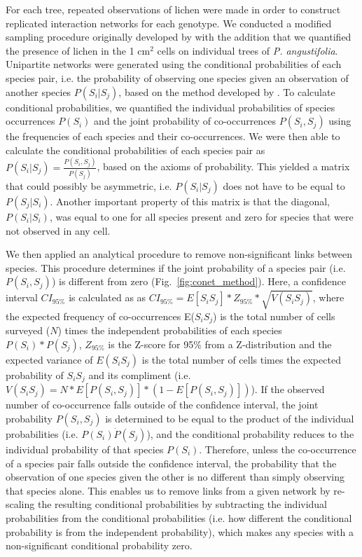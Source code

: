 \documentclass[11pt,twocolumn,twoside,lineno]{pnas-new}
\begin{document}
{For each tree, repeated observations of lichen were made in order to
construct replicated interaction networks for each genotype. We
conducted a modified sampling procedure originally developed by
\citep{Lamit2015a} with the addition that we quantified the presence
of lichen in the 1 cm$^2$ cells on individual trees of
\textit{P. angustifolia}. Unipartite networks were generated using the
conditional probabilities of each species pair, i.e. the probability
of observing one species given an observation of another species
$P(S_i | S_j)$, based on the method developed by
\citep{Araujo2011}. To calculate conditional probabilities, we
quantified the individual probabilities of species occurrences
$P(S_i)$ and the joint probability of co-occurrences $P(S_i, S_j)$
using the frequencies of each species and their co-occurrences. We
were then able to calculate the conditional probabilities of each
species pair as $P(S_i|S_j) = \frac{P(S_i,S_j)}{P(S_j)}$, based on the
axioms of probability. This yielded a matrix that could possibly be
asymmetric, i.e. $P(S_i|S_j)$ does not have to be equal to
$P(S_j|S_i)$. Another important property of this matrix is that the
diagonal, $P(S_{i} | S_{i})$, was equal to one for all species present
and zero for species that were not observed in any cell.

We then applied an analytical procedure to remove non-significant
links between species. This procedure determines if the joint
probability of a species pair (i.e. $P(S_i,S_j)$) is different from
zero (Fig.~\ref{fig:conet_method}).  Here, a confidence interval
$CI_{95\%}$ is calculated as as $CI_{95\%} = E[S_iS_j] * Z_{95\%} *
\sqrt{V(S_iS_j)}$, where the expected frequency of co-occurrences
E($S_iS_j$) is the total number of cells surveyed ($N$) times the
independent probabilities of each species $P(S_i) * P(S_j)$,
$Z_{95\%}$ is the Z-score for 95\% from a Z-distribution and the
expected variance of $E(S_iS_j)$ is the total number of cells times
the expected probability of $S_iS_j$ and its compliment
(i.e. $V(S_iS_j) = N * E[P(S_i,S_j)] * (1 - E[P(S_i,S_j)])$). If the
observed number of co-occurrence falls outside of the confidence
interval, the joint probability $P(S_i,S_j)$ is determined to be equal
to the product of the individual probabilities (i.e. $P(S_i) \dot
P(S_j)$), and the conditional probability reduces to the individual
probability of that species $P(S_i)$. Therefore, unless the
co-occurrence of a species pair falls outside the confidence interval,
the probability that the observation of one species given the other is
no different than simply observing that species alone. This enables us
to remove links from a given network by re-scaling the resulting
conditional probabilities by subtracting the individual probabilities
from the conditional probabilities (i.e. how different the conditional
probability is from the independent probability), which makes any
species with a non-significant conditional probability zero. 

}
\end{document}
